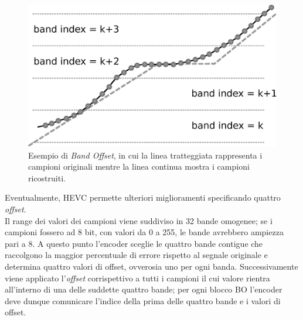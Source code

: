 \begin{figure}[H]
  \centering
  \captionsetup{justification=raggedright}
	  \includegraphics[scale=0.5]{Figures/Band_offset}
  \caption[Esempio di \emph{Band Offset}]
  	  {Esempio di \emph{Band Offset}, in cui la linea tratteggiata
	   rappresenta i campioni originali mentre la linea continua mostra
	   i campioni ricostruiti.}
\end{figure}

Eventualmente, HEVC permette ulteriori miglioramenti specificando quattro 
\emph{offset}. \\
Il range dei valori dei campioni viene suddiviso in 32 bande omogenee; se i 
campioni fossero ad 8 bit, con valori da 0 a 255, le bande avrebbero ampiezza 
pari a 8. A questo punto l'encoder sceglie le quattro bande contigue che 
raccolgono la maggior percentuale di errore rispetto al segnale originale e 
determina quattro valori di offset, ovverosia uno per ogni banda. 
Successivamente viene applicato l'\emph{offset} corrispettivo a tutti i campioni
il cui valore rientra all'interno di una delle suddette quattro bande; per ogni 
blocco BO l'encoder deve dunque comunicare l'indice della prima delle quattro 
bande e i valori di offset.


